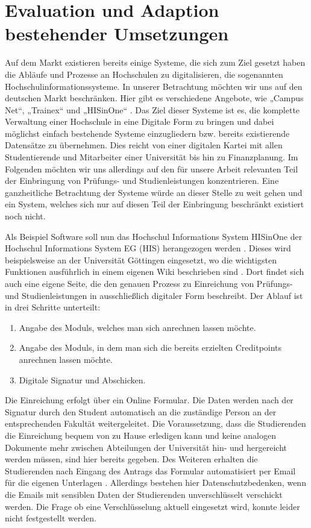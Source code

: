 \section{Evaluation und Adaption bestehender Umsetzungen}

Auf dem Markt existieren bereits einige Systeme, die sich zum Ziel gesetzt haben die Abläufe und Prozesse an Hochschulen zu digitalisieren, die sogenannten Hochschulinformationssysteme. In unserer Betrachtung möchten wir uns auf den deutschen Markt beschränken. Hier gibt es verschiedene Angebote, wie „Campus Net“, „Trainex“ und „HISinOne“ \parencite{wiki_his}. Das Ziel dieser Systeme ist es, die komplette Verwaltung einer Hochschule in eine Digitale Form zu bringen und dabei möglichst einfach bestehende Systeme einzugliedern bzw. bereits existierende Datensätze zu übernehmen. Dies reicht von einer digitalen Kartei mit allen Studentierende und Mitarbeiter einer Universität bis hin zu Finanzplanung. Im Folgenden möchten wir uns allerdings auf den für unsere Arbeit relevanten Teil der Einbringung von Prüfungs- und Studienleistungen konzentrieren. Eine ganzheitliche Betrachtung der Systeme würde an dieser Stelle zu weit gehen und ein System, welches sich nur auf diesen Teil der Einbringung beschränkt existiert noch nicht.

Als Beispiel Software soll nun das Hochschul Informations System HISinOne der Hochschul Informations System EG (HIS) herangezogen werden \parencite{hisde}. Dieses wird beispielsweise an der Universität Göttingen eingesetzt, wo die wichtigsten Funktionen ausführlich in einem eigenen Wiki beschrieben sind \parencite{studit}. Dort findet sich auch eine eigene Seite, die den genauen Prozess zu Einreichung von Prüfungs- und Studienleistungen in ausschließlich digitaler Form beschreibt. Der Ablauf ist in drei Schritte unterteilt:
\begin{enumerate}
\item Angabe des Moduls, welches man sich anrechnen lassen möchte.
\item Angabe des Moduls, in dem man sich die bereits erzielten Creditpoints anrechnen lassen möchte.
\item Digitale Signatur und Abschicken.
\end{enumerate}

Die Einreichung erfolgt über ein Online Formular. Die Daten werden nach der Signatur durch den Student automatisch an die zuständige Person an der entsprechenden Fakultät weitergeleitet. Die Voraussetzung, dass die Studierenden die Einreichung bequem von zu Hause erledigen kann und keine analogen Dokumente mehr zwischen Abteilungen der Universität hin- und hergereicht werden müssen, sind hier bereits gegeben. Des Weiteren erhalten die Studierenden nach Eingang des Antrags das Formular automatisiert per Email für die eigenen Unterlagen \parencite{studit_formular}. Allerdings bestehen hier Datenschutzbedenken, wenn die Emails mit sensiblen Daten der Studierenden unverschlüsselt verschickt werden. Die Frage ob eine Verschlüsselung aktuell eingesetzt wird, konnte leider nicht festgestellt  werden.
